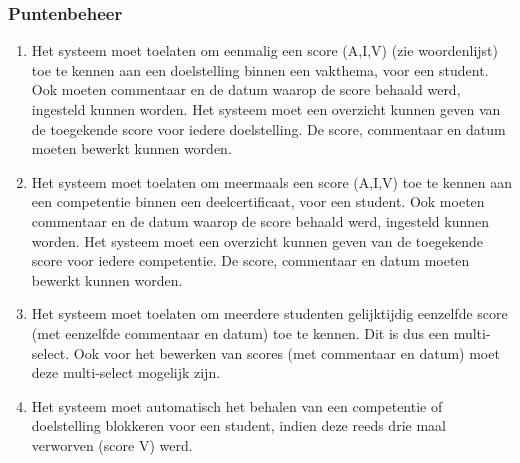 \documentclass[a4paper]{article}
\begin{document}
\subsubsection{Puntenbeheer}
\begin{enumerate}[label=F\arabic*,resume]
\item Het systeem moet toelaten om eenmalig een score (A,I,V) (zie woordenlijst) toe te kennen aan een doelstelling binnen een vakthema, voor een student. Ook moeten commentaar en de datum waarop de score behaald werd, ingesteld kunnen worden. Het systeem moet een overzicht kunnen geven van de toegekende score voor iedere doelstelling. De score, commentaar en datum moeten bewerkt kunnen worden.
\item Het systeem moet toelaten om meermaals een score (A,I,V) toe te kennen aan een competentie binnen een deelcertificaat, voor een student. Ook moeten commentaar en de datum waarop de score behaald werd, ingesteld kunnen worden. Het systeem moet een overzicht kunnen geven van de toegekende score voor iedere competentie. De score, commentaar en datum moeten bewerkt kunnen worden.
\item Het systeem moet toelaten om meerdere studenten gelijktijdig eenzelfde score (met eenzelfde commentaar en datum) toe te kennen. Dit is dus een multi-select. Ook voor het bewerken van scores (met commentaar en datum) moet deze multi-select mogelijk zijn.
\item Het systeem moet automatisch het behalen van een competentie of doelstelling blokkeren voor een student, indien deze reeds drie maal verworven (score V) werd.
\end{enumerate}
\end{document}
